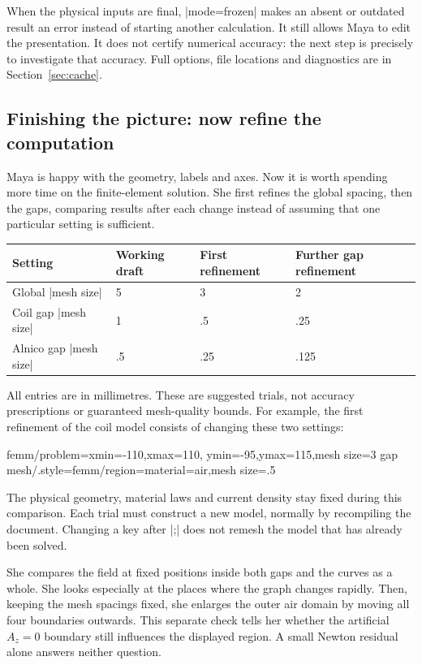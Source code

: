 When the physical inputs are final, |mode=frozen| makes an absent or outdated
result an error instead of starting another calculation. It still allows
Maya to edit the presentation. It does not certify numerical accuracy:
the next step is precisely to investigate that accuracy. Full options,
file locations and diagnostics are in Section~\ref{sec:cache}.

\subsection{Finishing the picture: now refine the computation}
\label{sec:tutorial-refinement}

Maya is happy with the geometry, labels and axes. Now it is worth spending more
time on the finite-element solution. She first refines the global spacing,
then the gaps, comparing results after each change instead of assuming that
one particular setting is sufficient.

\begin{center}
\begin{tabular}{llll}
\toprule Setting & Working draft & First refinement & Further gap refinement\\
\midrule
Global |mesh size| & 5 & 3 & 2\\
Coil gap |mesh size| & 1 & .5 & .25\\
Alnico gap |mesh size| & .5 & .25 & .125\\
\bottomrule
\end{tabular}
\end{center}
All entries are in millimetres. These are suggested trials, not accuracy
prescriptions or guaranteed mesh-quality bounds. For example, the first
refinement of the coil model consists of changing these two settings:
\begin{codeexample}
femm/problem={xmin=-110,xmax=110,
  ymin=-95,ymax=115,mesh size=3}
gap mesh/.style={femm/region={material=air,mesh size=.5}}
\end{codeexample}
The physical geometry, material laws and current density stay fixed during
this comparison. Each trial must construct a new model, normally by recompiling
the document. Changing a key after |;| does not remesh the
model that has already been solved.

She compares the field at fixed positions inside both gaps and the curves as
a whole. She looks especially at the places where the graph changes rapidly.
Then, keeping the mesh spacings fixed, she enlarges the outer air domain
by moving all four boundaries outwards. This separate check tells her whether
the artificial $A_z=0$ boundary still influences the displayed region.
A small Newton residual alone answers neither question.

